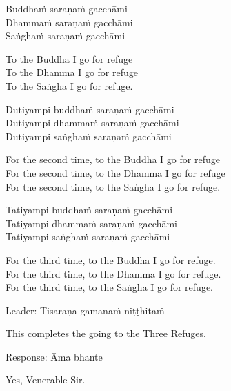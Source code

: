 Buddhaṁ saraṇaṁ gacchāmi\\
Dhammaṁ saraṇaṁ gacchāmi\\
Saṅghaṁ saraṇaṁ gacchāmi\\

\begin{english}
To the Buddha I go for refuge\\
To the Dhamma I go for refuge\\
To the Saṅgha I go for refuge.\\
\end{english}

Dutiyampi buddhaṁ saraṇaṁ gacchāmi\\
Dutiyampi dhammaṁ saraṇaṁ gacchāmi\\
Dutiyampi saṅghaṁ saraṇaṁ gacchāmi\\

\begin{english}
For the second time, to the Buddha I go for refuge\\
For the second time, to the Dhamma I go for refuge\\
For the second time, to the Saṅgha I go for refuge.\\
\end{english}

Tatiyampi buddhaṁ saraṇaṁ gacchāmi\\
Tatiyampi dhammaṁ saraṇaṁ gacchāmi\\
Tatiyampi saṅghaṁ saraṇaṁ gacchāmi\\

\begin{english}
For the third time, to the Buddha I go for refuge.\\
For the third time, to the Dhamma I go for refuge.\\
For the third time, to the Saṅgha I go for refuge.\\
\end{english}

Leader: Tisaraṇa-gamanaṁ niṭṭhitaṁ\\

\begin{english}
This completes the going to the Three Refuges.\\
\end{english}

Response: Āma bhante\\

\begin{english}
Yes, Venerable Sir.\\
\end{english}


